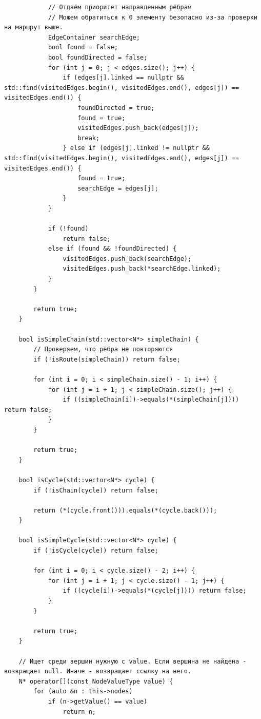 \documentclass[a4paper,14pt]{extarticle}
\begin{document}
\begin{enumerate}[1.]
\begin{verbatim}
            // Отдаём приоритет направленным рёбрам
            // Можем обратиться к 0 элементу безопасно из-за проверки на маршрут выше.
            EdgeContainer searchEdge;
            bool found = false;
            bool foundDirected = false;
            for (int j = 0; j < edges.size(); j++) {
                if (edges[j].linked == nullptr && std::find(visitedEdges.begin(), visitedEdges.end(), edges[j]) == visitedEdges.end()) {
                    foundDirected = true;
                    found = true;
                    visitedEdges.push_back(edges[j]);
                    break;
                } else if (edges[j].linked != nullptr && std::find(visitedEdges.begin(), visitedEdges.end(), edges[j]) == visitedEdges.end()) {
                    found = true;
                    searchEdge = edges[j];
                }
            }
            
            if (!found) 
                return false;
            else if (found && !foundDirected) {
                visitedEdges.push_back(searchEdge);
                visitedEdges.push_back(*searchEdge.linked);
            } 
        }

        return true;
    }

    bool isSimpleChain(std::vector<N*> simpleChain) {
        // Проверяем, что рёбра не повторяются
        if (!isRoute(simpleChain)) return false;

        for (int i = 0; i < simpleChain.size() - 1; i++) {
            for (int j = i + 1; j < simpleChain.size(); j++) {
                if ((simpleChain[i])->equals(*(simpleChain[j]))) return false;
            }
        }

        return true;
    }

    bool isCycle(std::vector<N*> cycle) {
        if (!isChain(cycle)) return false;

        return (*(cycle.front())).equals(*(cycle.back()));
    }

    bool isSimpleCycle(std::vector<N*> cycle) {
        if (!isCycle(cycle)) return false;

        for (int i = 0; i < cycle.size() - 2; i++) {
            for (int j = i + 1; j < cycle.size() - 1; j++) {
                if ((cycle[i])->equals(*(cycle[j]))) return false;
            }
        }

        return true;
    }

    // Ищет среди вершин нужную с value. Если вершина не найдена - возвращает null. Иначе - возвращает ссылку на него. 
    N* operator[](const NodeValueType value) {
        for (auto &n : this->nodes) 
            if (n->getValue() == value)
                return n;
        

\end{verbatim}
\end{enumerate}
\end{document}

